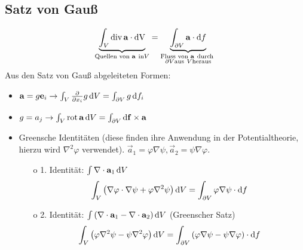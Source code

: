 \subsection{Satz von Gauß}

\begin{equation*}
	\underset{\text{Quellen von }\mathbf{a}~\mathrm{in} V}{\underbrace{ \int _{V}\operatorname{div} \mathbf{a}\cdot \mathrm{dV}}}=\underset{\substack{
			\text{Fluss von }\mathbf{a}~\text{durch } \\
			\partial V \mathrm{aus}~V \text{heraus}
		}}{\underbrace{\int _{\partial V}\mathbf{a}\cdot \mathop{}\!\mathrm{d} f}}
\end{equation*}
Aus den Satz von Gauß abgeleiteten Formen:
\begin{itemize}
	\item $\mathbf{a}=g\mathbf{e}_{i}\rightarrow \int _{V}\frac{\partial }{\partial x_{i}}g\mathop{}\!\mathrm{d} V=\int _{\partial V}g\mathop{}\!\mathrm{d} f_{i}$

	\item $g=a_{j}\rightarrow \int _{V}\operatorname{rot} \mathbf{a}\mathop{}\!\mathrm{d} V=\int _{\partial V}\mathop{}\!\mathrm{d} \mathbf{f}\times \mathbf{a}$

	\item Greensche Identitäten (diese finden ihre Anwendung in der Potentialtheorie, hierzu wird $\nabla ^{2}\varphi $ verwendet). $\vec {a}_{1}=\varphi \nabla \psi , \vec {a}_{2}=\psi \nabla \varphi $.

	      \begin{enumerate}[a]
		      \setcounter{enumii}{14}

		      \item[o] 1. Identität: $\int \nabla \cdot \mathbf{a}_{1}\mathop{}\!\mathrm{d} V$
			      \begin{equation*}
				      \int _{V}\left(\nabla \varphi \cdot \nabla \psi +\varphi \nabla ^{2}\psi \right)\mathop{}\!\mathrm{d} V=\int _{\partial V}\varphi \nabla \psi \cdot \mathop{}\!\mathrm{d} f
			      \end{equation*}
		      \item[o] 2. Identität: $\int \left(\nabla \cdot \mathbf{a}_{1}-\nabla \cdot \mathbf{a}_{2}\right)\mathop{}\!\mathrm{d} V$ (Greenscher Satz)
			      \begin{equation*}
				      \int _{V}\left(\varphi \nabla ^{2}\psi -\psi \nabla ^{2}\varphi \right)\mathop{}\!\mathrm{d} V=\int _{\partial V}\left(\varphi \nabla \psi -\psi \nabla \varphi \right)\cdot \mathop{}\!\mathrm{d} f
			      \end{equation*}
	      \end{enumerate}
\end{itemize}
